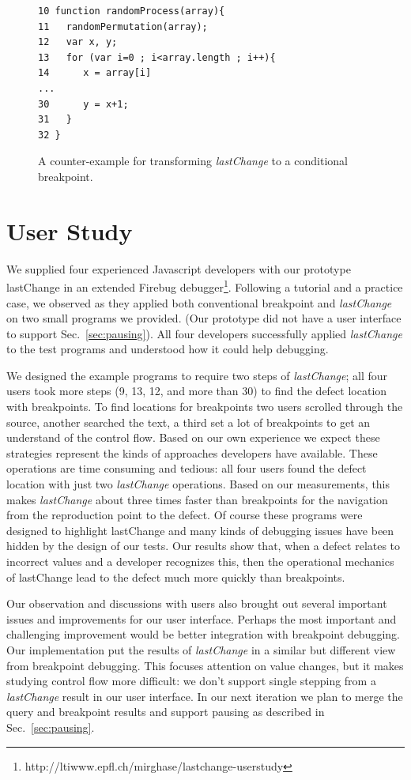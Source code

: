 \documentclass[runningheads,a4paper]{llncs}
\begin{document}
\begin{figure}[htp]
\begin{verbatim}
10 function randomProcess(array){
11   randomPermutation(array);
12   var x, y;
13   for (var i=0 ; i<array.length ; i++){
14      x = array[i]
...
30      y = x+1;
31   }
32 }
\end{verbatim}
\caption{A counter-example for transforming \textit{lastChange} to a conditional breakpoint.}
\label{fig:counter-example}
\end{figure}


\section{User Study}
We supplied four experienced Javascript developers with our prototype lastChange in an 
extended Firebug debugger\footnote[5]{http://ltiwww.epfl.ch/\texttildelow mirghase/lastchange-userstudy}. Following a tutorial and a practice case, we observed as they 
applied both conventional breakpoint and \textit{lastChange} on two small programs we 
provided. (Our prototype did not have a user interface to support Sec.~\ref{sec:pausing}).
All four developers successfully applied \textit{lastChange} to the test programs 
and understood how it could help debugging. 

We designed the example programs to require two steps of \textit{lastChange}; 
all four users took more steps (9, 13, 12, and more than 30) to find the defect location with breakpoints.  
To find locations for breakpoints two users scrolled through the source, 
another searched the text, a third set a lot of breakpoints to get an understand of the control flow. 
Based on our own experience we expect these strategies represent the kinds of approaches 
developers have available. These operations are time consuming and tedious: all four users 
found the defect location with just two \textit{lastChange} operations. Based on our measurements,
this makes \textit{lastChange} about three times faster than breakpoints for the navigation from 
the reproduction point to the defect.
Of course these programs were designed to highlight lastChange and many kinds of debugging 
issues have been hidden by the design of our tests. Our results show that, when a defect 
relates to incorrect values and a developer recognizes this, then the operational 
mechanics of lastChange lead to the defect much more quickly than breakpoints.

Our observation and discussions with users also brought out several important issues and improvements
for our user interface. Perhaps the most important and challenging improvement would be better integration 
with breakpoint debugging. Our implementation put the results of \textit{lastChange} in a similar but different
view from breakpoint debugging. This focuses attention on value changes, but it makes studying control 
flow more difficult: we don't support single stepping from a \textit{lastChange} result in our user interface. In our next iteration we 
plan to merge the query and breakpoint results and support pausing as described in Sec.~\ref{sec:pausing}.
\end{document}
